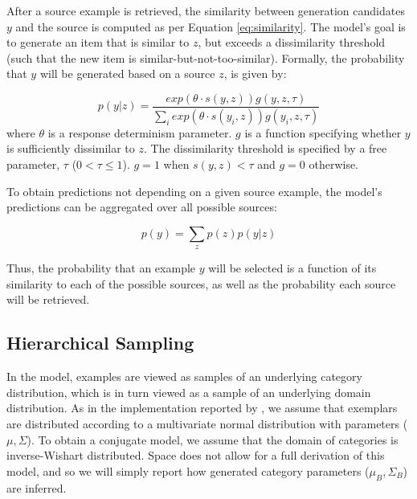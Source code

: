 \documentclass[10pt,letterpaper]{article}
\begin{document}
After a source example is retrieved, the similarity between generation candidates $y$ and the source is computed as per Equation \ref{eq:similarity}. The model's goal is to generate an item that is similar to $z$, but exceeds a dissimilarity threshold (such that the new item is similar-but-not-too-similar). Formally, the probability that $y$ will be generated based on a source $z$, is given by:

\begin{equation}
    p(y|z)  = \dfrac
    { exp(\theta \cdot s(y,z)) g(y,z,\tau)}
    {\sum_i{exp(\theta \cdot s(y_i,z)) g(y_i,z,\tau)}} 
\end{equation}
where $\theta$ is a response determinism parameter. $g$ is a function specifying whether $y$ is sufficiently dissimilar to $z$. The dissimilarity threshold is specified by a free parameter, $\tau$ ($0<\tau\leq1$). $g = 1$ when $s(y,z) < \tau$ and $g = 0$ otherwise.

To obtain predictions not depending on a given source example, the model's predictions can be aggregated over all possible sources:

\begin{equation}
  p(y) = \sum_z{p(z)p(y|z) }
\end{equation}

Thus, the probability that an example $y$ will be selected is a function of its similarity to each of the possible sources, as well as the probability each source will be retrieved.


\subsection{Hierarchical Sampling}

In the \cite{jern2013probabilistic} model, examples are viewed as samples of an underlying category distribution, which is in turn viewed as a sample of an underlying domain distribution. As in the implementation reported by \cite{jern2013probabilistic}, we assume that exemplars are distributed according to a multivariate normal distribution with parameters ($\mu, \Sigma$). To obtain a conjugate model, we assume that the domain of categories is inverse-Wishart distributed. Space does not allow for a full derivation of this model, and so we will simply report how generated category parameters ($\mu_B, \Sigma_B$) are inferred.



\end{document}
